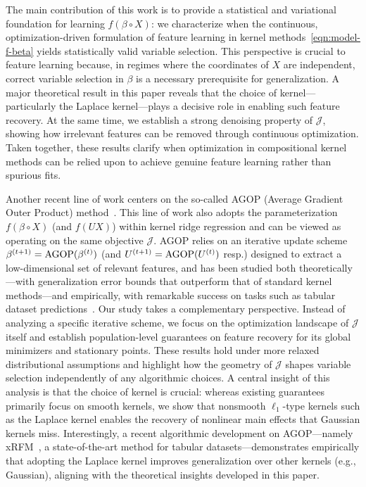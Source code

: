 \documentclass[sn-mathphys-num]{sn-jnl}%
\numberwithin{equation}{section}
\theoremstyle{thmstyleone}%
\theoremstyle{thmstyletwo}%
\theoremstyle{thmstylethree}%
\begin{document}
\begin{itemize}
The main contribution of this work is to provide a statistical and variational foundation for learning $f(\beta \circ X)$: we characterize when the continuous, optimization-driven formulation of feature learning in kernel methods~\eqref{eqn:model-f-beta} yields statistically valid variable selection. This perspective is crucial to feature learning because, in regimes where the coordinates of $X$ are independent, correct variable selection in $\beta$ is a necessary prerequisite for generalization. A major theoretical result in this paper reveals that the choice of kernel---particularly the Laplace kernel---plays a decisive role in enabling such feature recovery. At the same time, we establish a strong denoising property of $\mathcal{J}$, showing how irrelevant features can be  removed through continuous optimization. Taken together, these results clarify when optimization in compositional kernel methods can be relied upon to achieve genuine feature learning rather than spurious fits.



Another recent line of work centers on the so-called AGOP (Average Gradient Outer Product) method~\cite{Adit24A}. This line of work also adopts the parameterization $f(\beta \circ X)$ (and $f(UX)$) within kernel ridge regression and can be viewed as operating on the same objective $\mathcal{J}$. AGOP relies on an iterative update scheme $\beta^{(t+1)} = {\rm AGOP}(\beta^{(t)})$ (and $U^{(t+1)} = {\rm AGOP}(U^{(t)})$ resp.) designed to extract a low-dimensional set of relevant features, and has been studied both theoretically---with generalization error bounds that outperform that of standard kernel methods---and empirically, with remarkable success on tasks such as tabular dataset predictions~\cite{Adit24A, ZhuDaDrFa25}. Our study takes a complementary perspective. Instead of analyzing a specific iterative scheme, we focus on the optimization landscape of $\mathcal{J}$ itself and establish population-level guarantees on feature recovery for its global minimizers and stationary points. These results hold under more relaxed distributional assumptions and highlight how the geometry of $\mathcal{J}$ shapes variable selection independently of any algorithmic choices. A central insight of this analysis is that the choice of kernel is crucial: whereas existing guarantees primarily focus on smooth kernels, we show that nonsmooth $\ell_1$-type kernels such as the Laplace kernel enables the recovery of nonlinear main effects that Gaussian kernels miss. Interestingly, a recent algorithmic development on AGOP---namely xRFM~\cite{Beagleholeetal25}, a state-of-the-art method for tabular datasets---demonstrates empirically that adopting the Laplace kernel improves generalization over other kernels (e.g., Gaussian), aligning with the theoretical insights developed in this paper.
\end{itemize}
\end{document}
